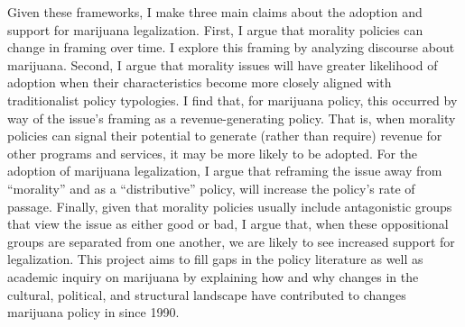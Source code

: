 Given these frameworks, I make three main claims about the adoption and support for marijuana legalization. First, I argue that morality policies can change in framing over time. I explore this framing by analyzing discourse about marijuana. Second, I argue that morality issues will have greater likelihood of adoption when their characteristics become more closely aligned with traditionalist policy typologies. I find that, for marijuana policy, this occurred by way of the issue's framing as a revenue-generating policy. That is, when morality policies can signal their potential to generate (rather than require) revenue for other programs and services, it may be more likely to be adopted. For the adoption of marijuana legalization, I argue that reframing the issue away from ``morality'' and as a ``distributive'' policy, will increase the policy's rate of passage. Finally, given that morality policies usually include antagonistic groups that view the issue as either good or bad, I argue that, when these oppositional groups are separated from one another, we are likely to see increased support for legalization. This project aims to fill gaps in the policy literature as well as academic inquiry on marijuana by explaining how and why changes in the cultural, political, and structural landscape have contributed to changes marijuana policy in since 1990.







